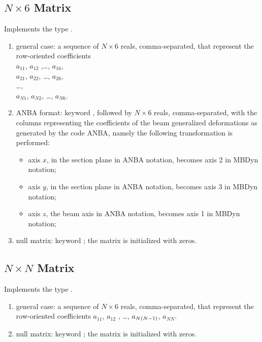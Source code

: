 \subsection{$N \times 6$ Matrix}
\label{sec:MatNx6}
Implements the type .
\begin{enumerate}
    \item general case: a sequence of $N \times 6$ reals, comma-separated, that
    represent the row-oriented coefficients \\
    $ a_{11} $, $ a_{12}$ ,\ldots, $ a_{16}$,\\
    $ a_{21}$, $ a_{22}$, \ldots, $ a_{26}$,\\
    \ldots, \\
    $ a_{N1} $, $ a_{N2} $, \ldots, $ a_{N6}$.\\
    \item ANBA format: keyword , followed by $N \times 6$ reals,
    comma-separated, with the columns representing the coefficients of the beam  
    generalized deformations as generated by the code ANBA, namely the following
    transformation is performed:
    \begin{itemize}
        \item axis $ x $, in the section plane in ANBA notation, 
	becomes axis 2 in MBDyn notation;    
	\item axis $ y $, in the section plane in ANBA notation, 
	becomes axis 3 in MBDyn notation;    
	\item axis $ z $, the beam axis in ANBA notation, 
	becomes axis 1 in MBDyn notation;    
    \end{itemize}
    \item null matrix: keyword ; the matrix is initialized 
    with zeros.
\end{enumerate}

\subsection{$N \times N$ Matrix}
\label{sec:MatNxN}
Implements the type .
\begin{enumerate}
    \item general case: a sequence of $N \times 6$ reals, comma-separated, that
    represent the row-oriented coefficients $ a_{11} $, $ a_{12}$ ,
    \ldots, $ a_{N\left( N-1 \right)} $, $ a_{NN} $.
    \item null matrix: keyword ; the matrix is initialized 
    with zeros.
\end{enumerate}


